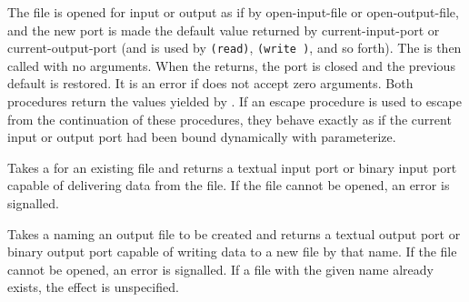\begin{entry}{%
}

The file is opened for input or output
as if by {\cf open-input-file} or {\cf open-output-file}, 
and the new port is made the default value returned by
{\cf current-input-port} or {\cf current-output-port}
(and is used by {\tt (read)}, {\tt (write )}, and so forth).
The  is then called with no arguments.  When the  returns,
the port is closed and the previous default is restored.
It is an error if  does not accept zero arguments.
Both procedures return the values yielded by .
If an escape procedure
is used to escape from the continuation of these procedures, they
behave exactly as if the current input or output port had been bound
dynamically with {\cf parameterize}.


\end{entry}


\begin{entry}{%
}
 
Takes a  for an existing file and returns a textual
input port or binary input port capable of delivering data from the
file.  If the file cannot be opened, an error is signalled.

\end{entry}


\begin{entry}{%
}

Takes a  naming an output file to be created and returns a
textual output port or binary output port capable of writing
data to a new file by that name.  If the file cannot be opened,
an error is signalled.
If a file with the given name already exists,
the effect is unspecified.

\end{entry}


